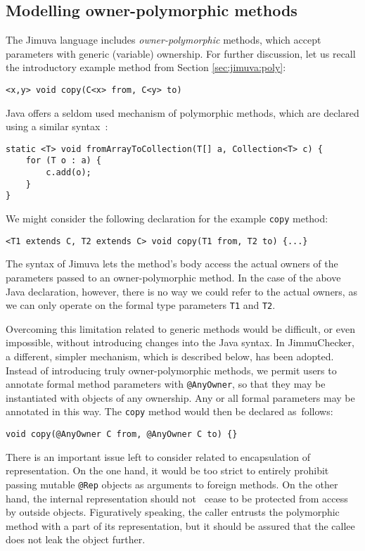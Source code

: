 \documentclass{pracamgr}
\theoremstyle{break}
\theoremstyle{break}
\theoremstyle{break}
\begin{document}
\subsection{Modelling owner-polymorphic methods}
\label{sec:mod:poly}

The Jimuva language includes \emph{owner-polymorphic} methods, which
accept parameters with generic (variable) ownership. For further
discussion, let us recall the introductory example method from Section
\ref{sec:jimuva:poly}:
\begin{center}
  \texttt{<x,y> void copy(C<x> from, C<y> to)}
\end{center}

Java offers a seldom used mechanism of polymorphic methods, which are
declared using a similar syntax~\cite{genericmethods}:
\begin{lstlisting}
static <T> void fromArrayToCollection(T[] a, Collection<T> c) {
    for (T o : a) {
        c.add(o);
    }
}
\end{lstlisting}

We might consider the following declaration for the example
\texttt{copy} method:
\begin{lstlisting}
<T1 extends C, T2 extends C> void copy(T1 from, T2 to) {...}
\end{lstlisting}
The syntax of Jimuva lets the method's body access the actual owners
of the parameters passed to an owner-polymorphic method. In the case
of the above Java declaration, however, there is no way we could refer
to the actual owners, as we can only operate on the formal type
parameters \texttt{T1} and \texttt{T2}.

Overcoming this limitation related to generic methods would be
difficult, or even impossible, without introducing changes into the
Java syntax. In JimmuChecker, a different, simpler mechanism, which is
described below, has been adopted. Instead of introducing truly
owner-polymorphic methods, we permit users to annotate formal method
parameters with \texttt{@AnyOwner}, so that they may be instantiated
with objects of any ownership. Any or all formal parameters may be
annotated in this way. The \texttt{copy} method would then be declared
as~follows:
\begin{center}
\texttt{void copy(@AnyOwner C from, @AnyOwner C to) \{\}}
\end{center}

There is an important issue left to consider related to encapsulation
of representation. On the one hand, it would be too strict to entirely
prohibit passing mutable \texttt{@Rep} objects as arguments to foreign
methods. On the other hand, the internal representation should not~
cease to be protected from access by outside objects. Figuratively
speaking, the caller entrusts the polymorphic method with a part of
its representation, but it should be assured that the callee does not
leak the object further.
\end{document}
